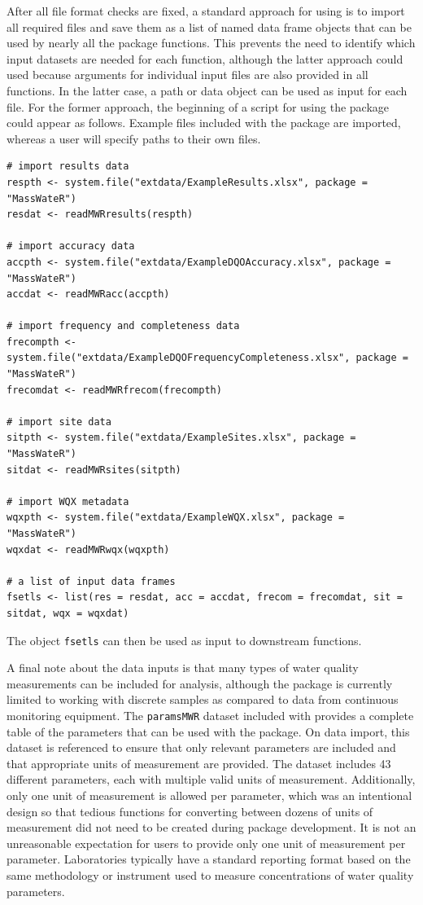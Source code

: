 After all file format checks are fixed, a standard approach for using  is to import all required files and save them as a list of named data frame objects that can be used by nearly all the package functions. This prevents the need to identify which input datasets are needed for each function, although the latter approach could used because arguments for individual input files are also provided in all functions. In the latter case, a path or data object can be used as input for each file. For the former approach, the beginning of a script for using the package could appear as follows. Example files included with the package are imported, whereas a user will specify paths to their own files.

\begin{verbatim}
# import results data
respth <- system.file("extdata/ExampleResults.xlsx", package = "MassWateR")
resdat <- readMWRresults(respth)

# import accuracy data
accpth <- system.file("extdata/ExampleDQOAccuracy.xlsx", package = "MassWateR")
accdat <- readMWRacc(accpth)

# import frequency and completeness data
frecompth <- system.file("extdata/ExampleDQOFrequencyCompleteness.xlsx", package = "MassWateR")
frecomdat <- readMWRfrecom(frecompth)

# import site data
sitpth <- system.file("extdata/ExampleSites.xlsx", package = "MassWateR")
sitdat <- readMWRsites(sitpth)

# import WQX metadata
wqxpth <- system.file("extdata/ExampleWQX.xlsx", package = "MassWateR")
wqxdat <- readMWRwqx(wqxpth)

# a list of input data frames
fsetls <- list(res = resdat, acc = accdat, frecom = frecomdat, sit = sitdat, wqx = wqxdat)
\end{verbatim}

The object \texttt{fsetls} can then be used as input to downstream functions.

A final note about the data inputs is that many types of water quality measurements can be included for analysis, although the package is currently limited to working with discrete samples as compared to data from continuous monitoring equipment. The \texttt{paramsMWR} dataset included with  provides a complete table of the parameters that can be used with the package. On data import, this dataset is referenced to ensure that only relevant parameters are included and that appropriate units of measurement are provided. The dataset includes 43 different parameters, each with multiple valid units of measurement. Additionally, only one unit of measurement is allowed per parameter, which was an intentional design so that tedious functions for converting between dozens of units of measurement did not need to be created during package development. It is not an unreasonable expectation for users to provide only one unit of measurement per parameter. Laboratories typically have a standard reporting format based on the same methodology or instrument used to measure concentrations of water quality parameters.

